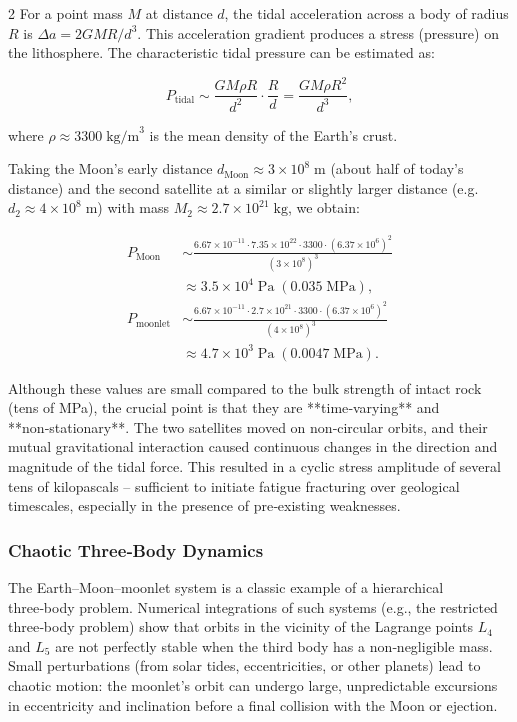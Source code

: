 \documentclass[11pt,a4paper]{article}
\begin{document}
\begin{multicols}{2}
		For a point mass \(M\) at distance \(d\), the tidal acceleration across a body of radius \(R\) is \(\Delta a = 2GM R / d^{3}\).  This acceleration gradient produces a stress (pressure) on the lithosphere.  The characteristic tidal pressure can be estimated as:
		
		\[
		P_{\text{tidal}} \sim \frac{GM \rho R}{d^{2}} \cdot \frac{R}{d} = \frac{GM \rho R^{2}}{d^{3}},
		\]
		
		where \(\rho \approx 3300\;\text{kg/m}^{3}\) is the mean density of the Earth’s crust.  
		
		Taking the Moon’s early distance \(d_{\text{Moon}} \approx 3\times10^{8}\;\text{m}\) (about half of today’s distance) and the second satellite at a similar or slightly larger distance (e.g. \(d_{2} \approx 4\times10^{8}\;\text{m}\)) with mass \(M_{2} \approx 2.7\times10^{21}\;\text{kg}\), we obtain:
		
		\[
		\begin{aligned}
			P_{\text{Moon}} &\sim \frac{6.67\times10^{-11} \cdot 7.35\times10^{22} \cdot 3300 \cdot (6.37\times10^{6})^{2}}{(3\times10^{8})^{3}} \\
			&\approx 3.5 \times 10^{4}\;\text{Pa} \;(0.035\;\text{MPa}),\\
			P_{\text{moonlet}} &\sim \frac{6.67\times10^{-11} \cdot 2.7\times10^{21} \cdot 3300 \cdot (6.37\times10^{6})^{2}}{(4\times10^{8})^{3}} \\
			&\approx 4.7 \times 10^{3}\;\text{Pa} \;(0.0047\;\text{MPa}).
		\end{aligned}
		\]
		
		Although these values are small compared to the bulk strength of intact rock (tens of MPa), the crucial point is that they are **time‑varying** and **non‑stationary**.  The two satellites moved on non‑circular orbits, and their mutual gravitational interaction caused continuous changes in the direction and magnitude of the tidal force.  This resulted in a cyclic stress amplitude of several tens of kilopascals – sufficient to initiate fatigue fracturing over geological timescales, especially in the presence of pre‑existing weaknesses.
		
		\subsubsection{Chaotic Three‑Body Dynamics}
		
		The Earth–Moon–moonlet system is a classic example of a hierarchical three‑body problem.  Numerical integrations of such systems (e.g., the restricted three‑body problem) show that orbits in the vicinity of the Lagrange points \(L_{4}\) and \(L_{5}\) are not perfectly stable when the third body has a non‑negligible mass.  Small perturbations (from solar tides, eccentricities, or other planets) lead to chaotic motion: the moonlet’s orbit can undergo large, unpredictable excursions in eccentricity and inclination before a final collision with the Moon or ejection.
		

\end{multicols}
\end{document}
